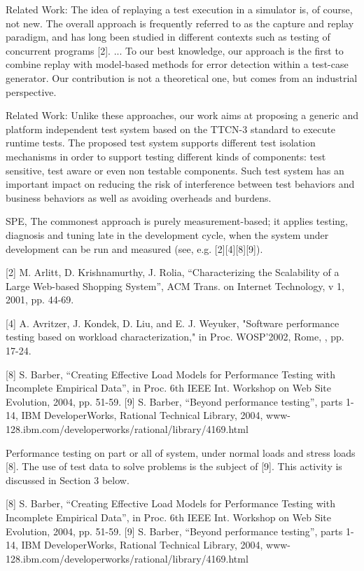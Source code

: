 \documentclass[runningheads,a4paper]{llncs}
\begin{document}
Related Work: The idea of replaying a test execution in a simulator is, of course, not new. The
overall approach is frequently referred to as the capture and replay paradigm,
and has long been studied in different contexts such as testing of concurrent
programs [2]. ... To our best knowledge, our approach is the first to combine replay with model-based
methods for error detection within a test-case generator. Our contribution is not
a theoretical one, but comes from an industrial perspective.

Related Work: Unlike these approaches, our work aims at proposing a generic and platform
independent test system based on the TTCN-3 standard to execute runtime
tests. The proposed test system supports different test isolation mechanisms in
order to support testing different kinds of components: test sensitive, test aware
or even non testable components. Such test system has an important impact on
reducing the risk of interference between test behaviors and business behaviors
as well as avoiding overheads and burdens.

SPE, The commonest approach is purely measurement-based; it
applies testing, diagnosis and tuning late in the development cycle, 
when the system under development can be run and measured (see, e.g.
[2][4][8][9]).

[2] M. Arlitt, D. Krishnamurthy, J. Rolia, “Characterizing
the Scalability of a Large Web-based Shopping System'',
ACM Trans. on Internet Technology, v 1, 2001, pp. 44-69.

[4] A. Avritzer, J. Kondek, D. Liu, and E. J. Weyuker,
"Software performance testing based on workload
characterization," in Proc. WOSP’2002, Rome, , pp. 17-24.

[8] S. Barber, “Creating Effective Load Models for
Performance Testing with Incomplete Empirical Data”, in
Proc. 6th IEEE Int. Workshop on Web Site Evolution, 2004,
pp. 51-59.
[9] S. Barber, “Beyond performance testing”, parts 1-14,
IBM DeveloperWorks, Rational Technical Library, 2004,
www-128.ibm.com/developerworks/rational/library/4169.html

Performance testing on part or all of system, under
normal loads and stress loads [8]. The use of test data
to solve problems is the subject of [9]. This activity is
discussed in Section 3 below.

[8] S. Barber, “Creating Effective Load Models for
Performance Testing with Incomplete Empirical Data”, in
Proc. 6th IEEE Int. Workshop on Web Site Evolution, 2004,
pp. 51-59.
[9] S. Barber, “Beyond performance testing”, parts 1-14,
IBM DeveloperWorks, Rational Technical Library, 2004,
www-128.ibm.com/developerworks/rational/library/4169.html
\end{document}
